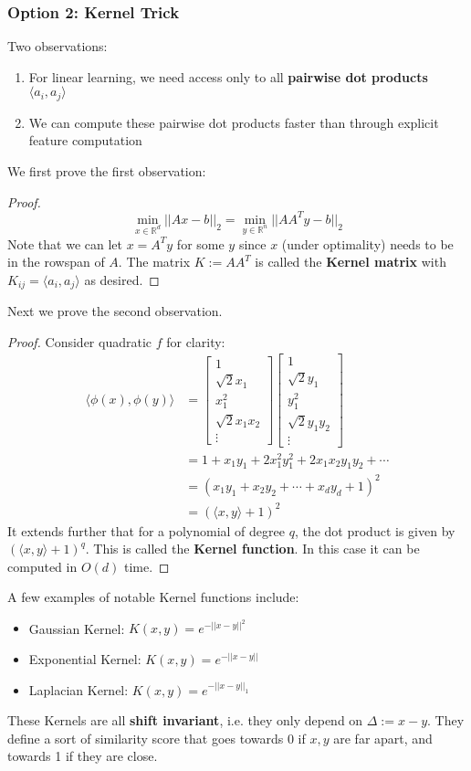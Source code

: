 \documentclass[11pt]{article}
\begin{document}
\subsubsection*{Option 2: Kernel Trick}
Two observations:
\begin{enumerate}
    \item For linear learning, we need access only to all \textbf{pairwise dot products} $\langle a_i, a_j \rangle$
    \item We can compute these pairwise dot products faster than through explicit feature computation
\end{enumerate}
We first prove the first observation:
\begin{proof}
$$\min_{x \in \mathbb{R}^d} ||Ax-b||_2 = \min_{y \in \mathbb{R}^n} ||AA^T y - b||_2$$
Note that we can let $x = A^Ty$ for some $y$ since $x$ (under optimality) needs to be in the rowspan of $A$. The matrix $K := AA^T$ is called the \textbf{Kernel matrix} with $K_{ij} = \langle a_i, a_j \rangle$ as desired.
\end{proof}
Next we prove the second observation. 
\begin{proof}
Consider quadratic $f$ for clarity:
\begin{align*}
\langle \phi(x), \phi(y) \rangle &= \begin{bmatrix}
1 \\ \sqrt{2} x_1 \\ x_1^2 \\ \sqrt{2} x_1x_2 \\ \vdots 
\end{bmatrix}
\begin{bmatrix}
1 \\ \sqrt{2} y_1 \\ y_1^2 \\ \sqrt{2} y_1y_2 \\ \vdots 
\end{bmatrix}\\
&= 1 + x_1y_1 + 2x_1^2y_1^2 + 2x_1x_2y_1y_2 + \cdots \\
&= (x_1y_1 + x_2y_2+ \cdots + x_dy_d + 1)^2 \\
&= (\langle x, y \rangle + 1)^2
\end{align*}
It extends further that for a polynomial of degree $q$, the dot product is given by $(\langle x, y \rangle +1)^q$. This is called the \textbf{Kernel function}. In this case it can be computed in $O(d)$ time. 
\end{proof}
A few examples of notable Kernel functions include:
\begin{itemize}
    \item Gaussian Kernel: $K(x,y) = e^{-||x-y||^2}$
    \item Exponential Kernel: $K(x,y) = e^{-||x-y||}$
    \item Laplacian Kernel: $K(x,y) = e^{-||x-y||_1}$
\end{itemize}
These Kernels are all \textbf{shift invariant}, i.e. they only depend on $\Delta :=  x-y$. They define a sort of similarity score that goes towards 0 if $x,y$ are far apart, and towards 1 if they are close. 
\end{document}

